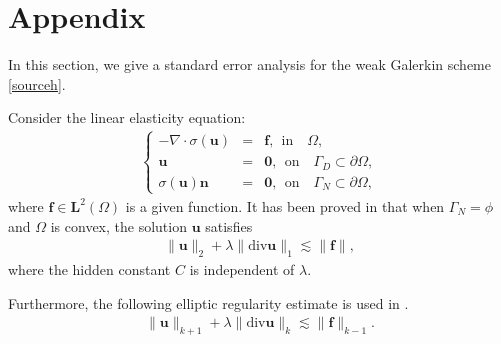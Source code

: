 \documentclass[leqno,CJK]{siamltex704}
\numberwithin{equation}{section}
\def\b0{\boldsymbol{0}}
\def\bu{{\mathbf{u}}}
\def\bl{{\mathbf{L}}}
\def\bn{{\mathbf{n}}}
\def\bf{{\mathbf{f}}}
\newcommand{\di}{\text{div}}
\begin{document}
\section{Appendix}In this section, we give a standard error analysis for the weak Galerkin scheme \eqref{sourceh}.

Consider the linear elasticity equation:
\begin{align}
	\left\{\begin{array}{rcl}
		-\nabla\cdot\sigma(\bu)&=&\bf,~~\text{in}\quad\Omega,\\
		\bu&=&\b0,~~\text{on}\quad\Gamma_D\subset\partial\Omega,\\
		\sigma(\bu)\bn&=&\b0,~~\text{on}\quad\Gamma_N\subset\partial\Omega,
	\end{array}\right.
\end{align}
where $\bf\in\bl^2(\Omega)$ is a given function. It has been proved in \cite{Bren1992} that when $\Gamma_N=\phi$ and $\Omega$ is convex, the solution $\bu$ satisfies
\begin{eqnarray*}
	\|\bu\|_2+\lambda\|\di\bu\|_1\lesssim \|\bf\|,
\end{eqnarray*}
where the hidden constant $C$ is independent of $\lambda$.

Furthermore, the following elliptic regularity estimate is used in \cite{Han2002}.
\begin{eqnarray}\label{reg}
	\|\bu\|_{k+1}+\lambda\|\di\bu\|_k\lesssim \|\bf\|_{k-1}.
\end{eqnarray}
\end{document}
